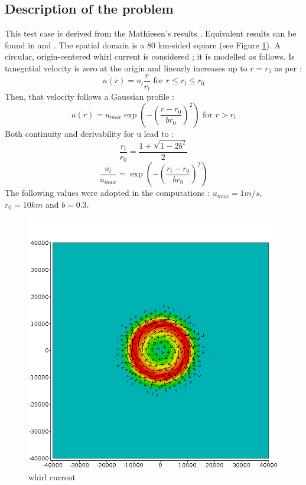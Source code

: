 \subsection{Description of the problem}
%
This test case is derived from the Mathiesen's results \cite{Mathiesen1987}.
Equivalent results can be found in \cite{Tolman1991} and \cite{Hubbert1991}. The
spatial domain is a 80 km-sided square (see Figure \ref{current}). A circular,
origin-centered whirl current is considered ; it is modelled as follows. Is
tanegntial velocity is zero at the origin and linearly increases up to $r=r_1$
as per :
$$
u(r) = u_l\frac{r}{r_l} \mbox{ for } r\le r_l\le r_0
$$
Then, that velocity follows a Gaussian profile :
$$
u(r)=u_{max} \exp ( -(\frac{r-r_0}{br_0})^2 ) \mbox{ for } r > r_l
$$
Both continuity and derivability for u lead to :
$$
\frac{r_l}{r_0}=\frac{1+ \sqrt{1-2b^2}}{2} %
$$
$$
\frac{u_l}{u_{max}}= \exp ( -(\frac{r_l-r_0}{br_0})^2 )
$$
The following values were adopted in the computations : $u_{max}=1m/s$,
$r_0=10km$ and $b=0.3$.
%
%
\begin{figure} [!h]
\centering
\includegraphics[scale = 0.7]{current.png}
 \caption{whirl current}
\label{current}
\end{figure}
